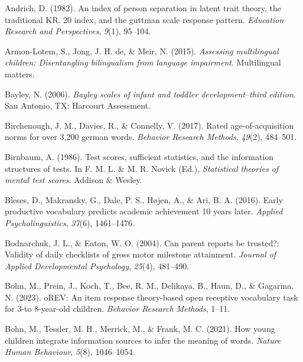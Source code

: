 \documentclass[
  man,floatsintext]{apa6}
\newlength{\cslhangindent}
\newlength{\cslentryspacingunit} %
\newenvironment{CSLReferences}[2] %
 {%
  \setlength{\parindent}{0pt}
  \ifodd #1
  \let\oldpar\par
  \def\par{\hangindent=\cslhangindent\oldpar}
  \fi
  \setlength{\parskip}{#2\cslentryspacingunit}
 }%
 {}
\begin{document}
\hypertarget{refs}{}
\begin{CSLReferences}{1}{0}
\leavevmode{}%
Andrich, D. (1982). An index of person separation in latent trait theory, the traditional KR. 20 index, and the guttman scale response pattern. \emph{Education Research and Perspectives}, \emph{9}(1), 95--104.

\leavevmode{}%
Armon-Lotem, S., Jong, J. H. de, \& Meir, N. (2015). \emph{Assessing multilingual children: Disentangling bilingualism from language impairment}. Multilingual matters.

\leavevmode{}%
Bayley, N. (2006). \emph{Bayley scales of infant and toddler development--third edition}. San Antonio, TX: Harcourt Assessment.

\leavevmode{}%
Birchenough, J. M., Davies, R., \& Connelly, V. (2017). Rated age-of-acquisition norms for over 3,200 german words. \emph{Behavior Research Methods}, \emph{49}(2), 484--501.

\leavevmode{}%
Birnbaum, A. (1986). Test scores, sufficient statistics, and the information structures of tests. In F. M. L. \& M. R. Novick (Ed.), \emph{Statistical theories of mental test scores}. Addison \& Wesley.

\leavevmode{}%
Bleses, D., Makransky, G., Dale, P. S., Højen, A., \& Ari, B. A. (2016). Early productive vocabulary predicts academic achievement 10 years later. \emph{Applied Psycholinguistics}, \emph{37}(6), 1461--1476.

\leavevmode{}%
Bodnarchuk, J. L., \& Eaton, W. O. (2004). Can parent reports be trusted?: Validity of daily checklists of gross motor milestone attainment. \emph{Journal of Applied Developmental Psychology}, \emph{25}(4), 481--490.

\leavevmode{}%
Bohn, M., Prein, J., Koch, T., Bee, R. M., Delikaya, B., Haun, D., \& Gagarina, N. (2023). oREV: An item response theory-based open receptive vocabulary task for 3-to 8-year-old children. \emph{Behavior Research Methods}, 1--11.

\leavevmode{}%
Bohn, M., Tessler, M. H., Merrick, M., \& Frank, M. C. (2021). How young children integrate information sources to infer the meaning of words. \emph{Nature Human Behaviour}, \emph{5}(8), 1046--1054.


\end{CSLReferences}
\end{document}
